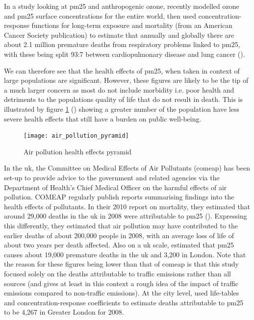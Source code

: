 In a study looking at \gls{pm25} and anthropogenic ozone, \cite{Silva2013} recently modelled ozone and \gls{pm25} surface concentrations for the entire world, then used concentration-response functions for long-term exposure and mortality (from an American Cancer Society publication) to estimate that annually and globally there are about 2.1 million premature deaths from respiratory problems linked to \gls{pm25}, with these being split 93:7 between cardiopulmonary disease and lung cancer (\cite{Silva2013}).

We can therefore see that the health effects of \gls{pm25}, when taken in context of large populations are significant. However, these figures are likely to be the tip of a much larger concern as most do not include morbidity i.e. poor health and detriments to the populations quality of life that do not result in death. This is illustrated by figure \ref{fig:airpollutionpyramid} (\cite{Mannino2000}) showing a greater number of the population have less severe health effects that still have a burden on public well-being.

\begin{figure}[H]
\centering
\texttt{[image: air\_pollution\_pyramid]}
\caption{Air pollution health effects pyramid}
\label{fig:airpollutionpyramid}
\end{figure}


In the \gls{uk}, the Committee on Medical Effects of Air Pollutants (\gls{comeap}) has been set-up to provide advice to the government and related agencies via the Department of Health's Chief Medical Officer on the harmful effects of air pollution. COMEAP regularly publish reports summarising findings into the health effects of pollutants. In their 2010 report on mortality, they estimated that around 29,000 deaths in the \gls{uk} in 2008 were attributable to \gls{pm25} (\cite{CommitteeontheMedicalEffectsofAirPollutants2009}). Expressing this differently, they estimated that air pollution may have contributed to the earlier deaths of about 200,000 people in 2008, with an average loss of life of about two years per death affected. Also on a \gls{uk} scale, \cite{Yim2012} estimated that \gls{pm25} causes about 19,000 premature deaths in the \gls{uk} and 3,200 in London. Note that the reason for these figures being lower than that of \gls{comeap} is that this study focused solely on the deaths attributable to traffic emissions rather than all sources (and gives at least in this context a rough idea of the impact of traffic emissions compared to non-traffic emissions). At the city level, \cite{Miller2010} used life-tables and concentration-response coefficients to estimate deaths attributable to \gls{pm25} to be 4,267 in Greater London for 2008.

